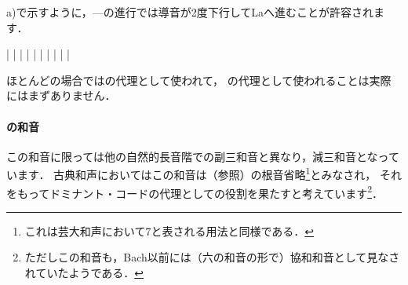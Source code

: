 \documentclass[dvipdfmx,uplatex,b5paper,openany,jbase=12Q,nomag*,textwidth-limit=44%
               ]{gachimuchi}[2020/05/05]
\begin{document}
a)で示すように，---の進行では導音が2度下行してLaへ進むことが許容されます．

\begin{floatMusic}[pos=ht]
  \Startpiece%
  \znotes|\en
  \NOTes
  |%
  \en\bar
  \NOTEs
  |%
  \en\doublebar
  \NOTEs
  |%
  \en\bar
  \NOTEs
  |%
  \en\doublebar
  \NOTes
  |%
  \en\bar
  \NOTes
  \Mryaku\sk%
  |%
  \Mryaku\sk
  \en\setdoublebar
  \endpiece%
\end{floatMusic}
ほとんどの場合ではの代理として使われて，
の代理として使われることは実際にはまずありません．

\paragraph{\Gnvii\Dimt の和音}
この和音に限っては他の自然的長音階での副三和音と異なり，減三和音となっています．
古典和声においてはこの和音は\Gnv{}（参照）の根音省略\footnote{%
  これは芸大和声において\Slash\Gnv\subsc7と表される用法と同様である．
}とみなされ，
それをもってドミナント・コードの代理としての役割を果たすと考えています\footnote{%
  ただしこの和音も，Bach以前には（六の和音の形で）協和和音として見なされていたようである\cite[p.64]{chDIETHER1}．
}．
\end{document}
